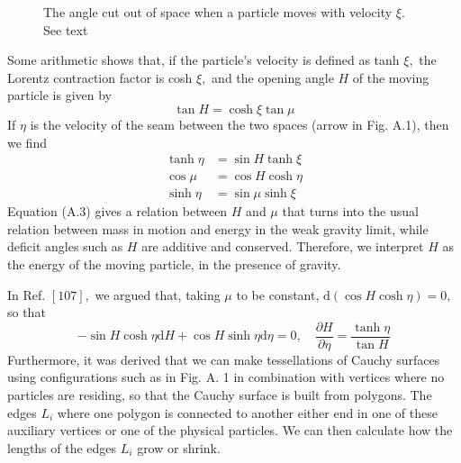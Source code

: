 \documentclass[main.tex]{subfiles}
\begin{document}
\begin{figure}[ht]
	\begin{center}
		\caption{
		\label{iA.1} The angle cut out of space when a particle moves with velocity $\xi$. See text}
	\end {center}
\end {figure}


Some arithmetic shows that, if the particle's velocity is defined as tanh $\xi,$ the Lorentz contraction factor is cosh $\xi,$ and the opening angle $H$ of the moving particle is given by
$$
\tan H=\cosh \xi \tan \mu
$$
If $\eta$ is the velocity of the seam between the two spaces (arrow in Fig. A.1), then we find
$$
\begin{aligned}
\tanh \eta &=\sin H \tanh \xi \\
\cos \mu &=\cos H \cosh \eta \\
\sinh \eta &=\sin \mu \sinh \xi
\end{aligned}
$$
Equation (A.3) gives a relation between $H$ and $\mu$ that turns into the usual relation between mass in motion and energy in the weak gravity limit, while deficit angles such as $H$ are additive and conserved. Therefore, we interpret $H$ as the energy of the moving particle, in the presence of gravity.

In Ref. $[107],$ we argued that, taking $\mu$ to be constant, $\mathrm{d}(\cos H \cosh \eta)=0,$ so that
$$
-\sin H \cosh \eta \mathrm{d} H+\cos H \sinh \eta \mathrm{d} \eta=0, \quad \frac{\partial H}{\partial \eta}=\frac{\tanh \eta}{\tan H}
$$
Furthermore, it was derived that we can make tessellations of Cauchy surfaces using configurations such as in Fig. A. 1 in combination with vertices where no particles are residing, so that the Cauchy surface is built from polygons. The edges $L_{i}$ where one polygon is connected to another either end in one of these auxiliary vertices or one of the physical particles. We can then calculate how the lengths of the edges $L_{i}$ grow or shrink.
\end{document}

